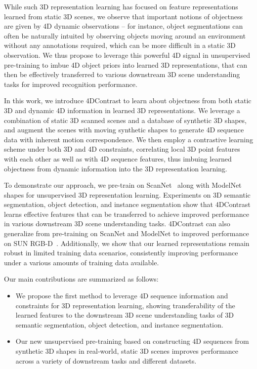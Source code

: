 \documentclass[runningheads]{llncs}
\newcommand{\OURS}{4DContrast}
\begin{document}
While such 3D representation learning has focused on feature representations learned from static 3D scenes, we observe that important notions of objectness are given by 4D dynamic observations -- for instance, object segmentations can often be naturally intuited by observing objects moving around an environment without any annotations required, which can be more difficult in a static 3D observation.
We thus propose to leverage this powerful 4D signal in unsupervised pre-training to imbue 4D object priors into learned 3D representations, that can then be effectively transferred to various downstream 3D scene understanding tasks for improved recognition performance.

In this work, we introduce \OURS{} to learn about objectness from both static 3D and dynamic 4D information in learned 3D representations.
We leverage a combination of static 3D scanned scenes and a database of synthetic 3D shapes, and augment the scenes with moving synthetic shapes to generate 4D sequence data with inherent motion correspondence.
We then employ a contrastive learning scheme under both 3D and 4D constraints, correlating local 3D point features with each other as well as with 4D sequence features, thus imbuing learned objectness from dynamic information into the 3D representation learning.

To demonstrate our approach, we pre-train on ScanNet~\cite{dai2017scannet} along with ModelNet~\cite{wu20153d} shapes for unsupervised 3D representation learning.
Experiments on 3D semantic segmentation, object detection, and instance segmentation show that \OURS{} learns effective features that can be transferred to achieve improved performance in various downstream 3D scene understanding tasks.
\OURS{} can also generalize from pre-training on ScanNet and ModelNet to improved performance on SUN RGB-D~\cite{song2015sun}.
Additionally, we show that our learned representations remain robust in limited training data scenarios, consistently improving performance under a various amounts of training data available.

Our main contributions are summarized as follows:
\begin{itemize}
    \item We propose the first method to leverage 4D sequence information and constraints for 3D representation learning, showing transferability of the learned features to the downstream 3D scene understanding tasks of 3D semantic segmentation, object detection, and instance segmentation.
    \item Our new unsupervised pre-training based on constructing 4D sequences from synthetic 3D shapes in real-world, static 3D scenes improves performance across a variety of downstream tasks and different datasets.
\end{itemize}
\end{document}
